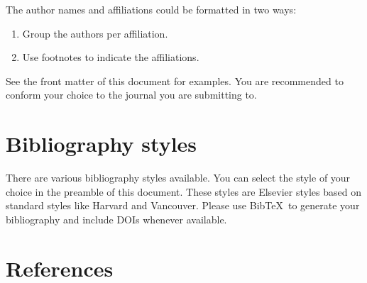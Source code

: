 \documentclass[review]{elsarticle}
\begin{document}
The author names and affiliations could be formatted in two ways:
\begin{enumerate}[(1)]
    \item Group the authors per affiliation.
    \item Use footnotes to indicate the affiliations.
\end{enumerate}
See the front matter of this document for examples. You are recommended to conform your choice to the journal you are submitting to.

\section{Bibliography styles}

There are various bibliography styles available. You can select the style of your choice in the preamble of this document. These styles are Elsevier styles based on standard styles like Harvard and Vancouver. Please use Bib\TeX\ to generate your bibliography and include DOIs whenever available.


\section*{References}

%
\end{document}
